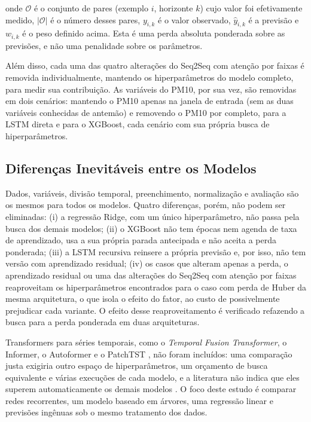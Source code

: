 \noindent onde \(\mathcal{O}\) é o conjunto de pares (exemplo \(i\), horizonte \(k\)) cujo valor foi efetivamente medido, \(|\mathcal{O}|\) é o número desses pares, \(y_{i,k}\) é o valor observado, \(\hat{y}_{i,k}\) é a previsão e \(w_{i,k}\) é o peso definido acima. Esta é uma perda absoluta ponderada sobre as previsões, e não uma penalidade sobre os parâmetros.

Além disso, cada uma das quatro alterações do Seq2Seq com atenção por faixas é removida individualmente, mantendo os hiperparâmetros do modelo completo, para medir sua contribuição. As variáveis do PM10, por sua vez, são removidas em dois cenários: mantendo o PM10 apenas na janela de entrada (sem as duas variáveis conhecidas de antemão) e removendo o PM10 por completo, para a LSTM direta e para o XGBoost, cada cenário com sua própria busca de hiperparâmetros.

\subsection{Diferenças Inevitáveis entre os Modelos}

Dados, variáveis, divisão temporal, preenchimento, normalização e avaliação são os mesmos para todos os modelos. Quatro diferenças, porém, não podem ser eliminadas: (i) a regressão Ridge, com um único hiperparâmetro, não passa pela busca dos demais modelos; (ii) o XGBoost não tem épocas nem agenda de taxa de aprendizado, usa a sua própria parada antecipada e não aceita a perda ponderada; (iii) a LSTM recursiva reinsere a própria previsão e, por isso, não tem versão com aprendizado residual; (iv) os casos que alteram apenas a perda, o aprendizado residual ou uma das alterações do Seq2Seq com atenção por faixas reaproveitam os hiperparâmetros encontrados para o caso com perda de Huber da mesma arquitetura, o que isola o efeito do fator, ao custo de possivelmente prejudicar cada variante. O efeito desse reaproveitamento é verificado refazendo a busca para a perda ponderada em duas arquiteturas.

Transformers para séries temporais, como o \textit{Temporal Fusion Transformer}, o Informer, o Autoformer e o PatchTST \cite{lim2021tft,zhou2021informer,wu2021autoformer,nie2023patchtst}, não foram incluídos: uma comparação justa exigiria outro espaço de hiperparâmetros, um orçamento de busca equivalente e várias execuções de cada modelo, e a literatura não indica que eles superem automaticamente os demais modelos \cite{zeng2023transformers}. O foco deste estudo é comparar redes recorrentes, um modelo baseado em árvores, uma regressão linear e previsões ingênuas sob o mesmo tratamento dos dados.

